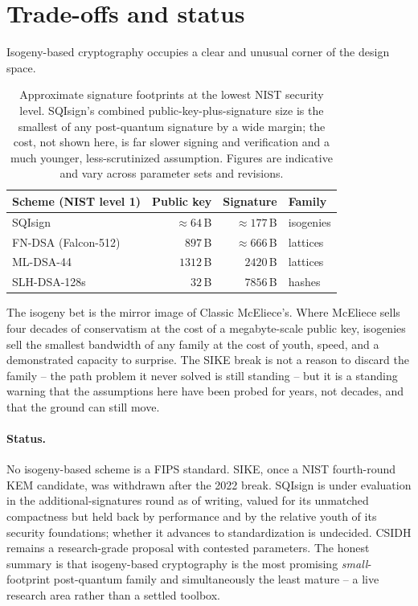 \section{Trade-offs and status}

Isogeny-based cryptography occupies a clear and unusual corner of the design space.

\begin{table}[H]
\centering
\begin{tabular}{lrrl}
\toprule
Scheme (NIST level 1) & Public key & Signature & Family \\
\midrule
SQIsign        & $\approx 64$\,B   & $\approx 177$\,B  & isogenies \\
FN-DSA (Falcon-512) & $897$\,B      & $\approx 666$\,B  & lattices \\
ML-DSA-44      & $1312$\,B         & $2420$\,B         & lattices \\
SLH-DSA-128s   & $32$\,B           & $7856$\,B         & hashes \\
\bottomrule
\end{tabular}
\caption{Approximate signature footprints at the lowest NIST security level. SQIsign's combined public-key-plus-signature size is the smallest of any post-quantum signature by a wide margin; the cost, not shown here, is far slower signing and verification and a much younger, less-scrutinized assumption. Figures are indicative and vary across parameter sets and revisions.}
\label{tab:sqisign-vs}
\end{table}

\begin{remark}
The isogeny bet is the mirror image of Classic McEliece's. Where McEliece sells four decades of conservatism at the cost of a megabyte-scale public key, isogenies sell the smallest bandwidth of any family at the cost of youth, speed, and a demonstrated capacity to surprise. The SIKE break is not a reason to discard the family -- the path problem it never solved is still standing -- but it is a standing warning that the assumptions here have been probed for years, not decades, and that the ground can still move.
\end{remark}

\paragraph{Status.}
No isogeny-based scheme is a FIPS standard. SIKE, once a NIST fourth-round KEM candidate, was withdrawn after the 2022 break. SQIsign is under evaluation in the additional-signatures round as of writing, valued for its unmatched compactness but held back by performance and by the relative youth of its security foundations; whether it advances to standardization is undecided. CSIDH remains a research-grade proposal with contested parameters. The honest summary is that isogeny-based cryptography is the most promising \emph{small}-footprint post-quantum family and simultaneously the least mature -- a live research area rather than a settled toolbox.

